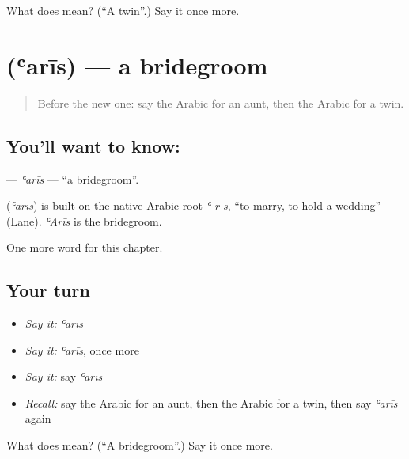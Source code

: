 \begin{tcolorbox}[breakable,colback=teal!4,colframe=teal!35!black,title={Before you move on}]
What does  mean? (\textquotedblleft{}A twin\textquotedblright{}.) Say it once more.
\end{tcolorbox}
\section[\texorpdfstring{\ar{عريس} (ʿarīs)}{عريس (ʿarīs)}]{ (ʿarīs) — a bridegroom}

\label{lesson:AR-C246-aris}



\begin{quote}
Before the new one: say the Arabic for an aunt, then the Arabic for a twin.
\end{quote}

\subsection*{You'll want to know: }
\textbf{} — \emph{ʿarīs} — \textquotedblleft{}a bridegroom\textquotedblright{}.

\begin{cousinweb}
\textbf{} (\emph{ʿarīs}) is built on the native Arabic root \emph{ʿ-r-s}, \textquotedblleft{}to marry, to hold a wedding\textquotedblright{} (Lane). \emph{ʿArīs} is the bridegroom.
\end{cousinweb}

\begin{grammarlens}[title={What you've built}]
One more word for this chapter.
\end{grammarlens}

\subsection*{Your turn}
\begin{itemize}
\raggedright
  \item \emph{Say it:} \emph{ʿarīs}
  \item \emph{Say it:} \emph{ʿarīs}, once more
  \item \emph{Say it:} say \emph{ʿarīs}
  \item \emph{Recall:} say the Arabic for an aunt, then the Arabic for a twin, then say \emph{ʿarīs} again
\end{itemize}

\begin{tcolorbox}[breakable,colback=teal!4,colframe=teal!35!black,title={Before you move on}]
What does  mean? (\textquotedblleft{}A bridegroom\textquotedblright{}.) Say it once more.
\end{tcolorbox}
